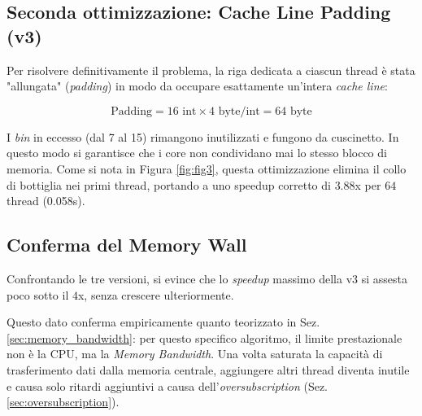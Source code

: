 \documentclass[a4paper,11pt]{article}
\begin{document}
\subsection{Seconda ottimizzazione: Cache Line Padding (v3)}
Per risolvere definitivamente il problema, la riga dedicata a ciascun thread è stata "allungata" (\textit{padding}) in modo da occupare esattamente un'intera \textit{cache line}:

\begin{equation}
\text{Padding} = 16 \text{ int} \times 4 \text{ byte/int} = 64 \text{ byte}
\end{equation}

I \textit{bin} in eccesso (dal 7 al 15) rimangono inutilizzati e fungono da cuscinetto. In questo modo si garantisce che i core non condividano mai lo stesso blocco di memoria. Come si nota in Figura \ref{fig:fig3}, questa ottimizzazione elimina il collo di bottiglia nei primi thread, portando a uno speedup corretto di $3.88$x per $64$ thread (0.058s).

\subsection{Conferma del Memory Wall}
Confrontando le tre versioni, si evince che lo \textit{speedup} massimo della v3 si assesta poco sotto il $4$x, senza crescere ulteriormente. 

Questo dato conferma empiricamente quanto teorizzato in Sez. \ref{sec:memory_bandwidth}: per questo specifico algoritmo, il limite prestazionale non è la CPU, ma la \textit{Memory Bandwidth}. Una volta saturata la capacità di trasferimento dati dalla memoria centrale, aggiungere altri thread diventa inutile e causa solo ritardi aggiuntivi a causa dell'\textit{oversubscription} (Sez. \ref{sec:oversubscription}).

\vspace{1cm}
\end{document}
